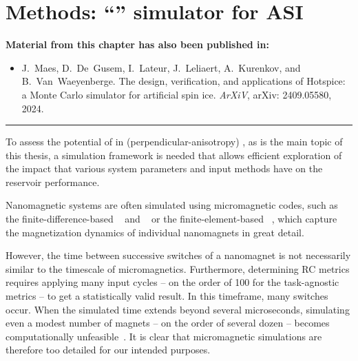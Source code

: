 \chapter{Methods: ``\hotspice'' simulator for ASI}\label{ch:Hotspice}

\begin{adjustwidth}{2em}{2em} %
    \begin{center}
        \textbf{Material from this chapter has also been published in:} \\
    \end{center}
    \vspace{1em}
    \begin{adjustwidth}{0em}{3em}
	    \begin{itemize}
	    	\item[\cite{MAES-24}] J.~Maes, D.~De~Gusem, I.~Lateur, J.~Leliaert, A.~Kurenkov, and B.~Van~Waeyenberge.
	    	\newblock The design, verification, and applications of Hotspice: a Monte Carlo simulator for artificial spin ice.
	    	\newblock \emph{ArXiV}, arXiv: 2409.05580, 2024.
	    \end{itemize}
    \end{adjustwidth}
    \vspace{1em}
    \begin{center}
        \centering\rule{0.6\linewidth}{0.4pt}
    \end{center}
    \vspace{1em}
\end{adjustwidth}

To assess the potential of  in (perpendicular-anisotropy) , as is the main topic of this thesis, a simulation framework is needed that allows efficient exploration of the impact that various system parameters and input methods have on the reservoir performance. \\\par

Nanomagnetic systems are often simulated using micromagnetic codes, such as the finite-difference-based \mumax~\cite{mumax3} and \oommf~\cite{OOMMF} or the finite-element-based \nmag~\cite{Nmag}, which capture the magnetization dynamics of individual nanomagnets in great detail. \par
However, the time between successive switches of a nanomagnet is not necessarily similar to the timescale of micromagnetics. Furthermore, determining RC metrics requires applying many input cycles -- on the order of 100 for the task-agnostic metrics -- to get a statistically valid result. In this timeframe, many switches occur. When the simulated time extends beyond several microseconds, simulating even a modest number of magnets -- on the order of several dozen -- becomes computationally unfeasible~\cite{leo2021chiral}. It is clear that micromagnetic simulations are therefore too detailed for our intended purposes. \\\par

